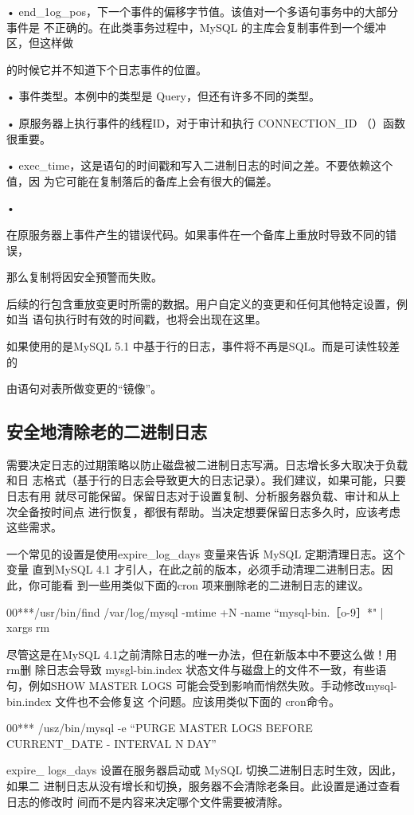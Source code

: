 • end\_1og\_pos，下一个事件的偏移字节值。该值对一个多语句事务中的大部分事件是
不正确的。在此类事务过程中，MySQL 的主库会复制事件到一个缓冲区，但这样做

的时候它并不知道下个日志事件的位置。

• 事件类型。本例中的类型是 Query，但还有许多不同的类型。

• 原服务器上执行事件的线程ID，对于审计和执行 CONNECTION\_ID （）函数很重要。

• exec\_time，这是语句的时间戳和写入二进制日志的时间之差。不要依赖这个值，因
为它可能在复制落后的备库上会有很大的偏差。

•

在原服务器上事件产生的错误代码。如果事件在一个备库上重放时导致不同的错误，

那么复制将因安全预警而失败。

后续的行包含重放变更时所需的数据。用户自定义的变更和任何其他特定设置，例如当
语句执行时有效的时间戳，也将会出现在这里。

如果使用的是MySQL 5.1 中基于行的日志，事件将不再是SQL。而是可读性较差的

由语句对表所做变更的“镜像”。

\subsection{安全地清除老的二进制日志}
需要决定日志的过期策略以防止磁盘被二进制日志写满。日志增长多大取决于负载和日
志格式（基于行的日志会导致更大的日志记录）。我们建议，如果可能，只要日志有用
就尽可能保留。保留日志对于设置复制、分析服务器负载、审计和从上次全备按时间点
进行恢复，都很有帮助。当决定想要保留日志多久时，应该考虑这些需求。

一个常见的设置是使用expire\_log\_days 变量来告诉 MySQL 定期清理日志。这个变量
直到MySQL 4.1 才引人，在此之前的版本，必须手动清理二进制日志。因此，你可能看
到一些用类似下面的cron 项来删除老的二进制日志的建议。

00***/usr/bin/find /var/log/mysql -mtime +N -name “mysql-bin.［o-9］*" | xargs rm

尽管这是在MySQL 4.1之前清除日志的唯一办法，但在新版本中不要这么做！用rm删
除日志会导致 mysgl-bin.index 状态文件与磁盘上的文件不一致，有些语句，例如SHOW
MASTER LOGS 可能会受到影响而悄然失败。手动修改mysql-bin.index 文件也不会修复这
个问题。应该用类似下面的 cron命令。

00*** /usz/bin/mysql -e “PURGE MASTER LOGS BEFORE CURRENT\_DATE - INTERVAL N DAY”

expire\_ logs\_days 设置在服务器启动或 MySQL 切换二进制日志时生效，因此，如果二
进制日志从没有增长和切换，服务器不会清除老条目。此设置是通过查看日志的修改时
间而不是内容来决定哪个文件需要被清除。

